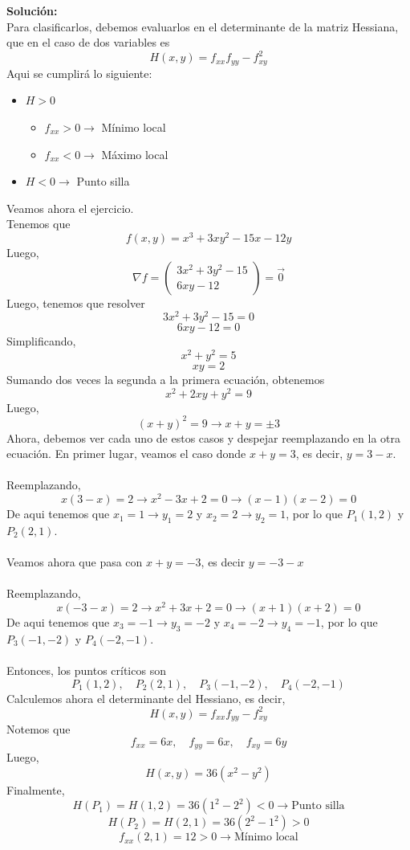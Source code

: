 \documentclass[12pt]{article}
\newenvironment{solucion}
{\begin{mdframed}[backgroundcolor=black!10]
		{\bf Solución:}\\
	}
	{
	\end{mdframed}
}
\newenvironment{preguntas}
{\begin{enumerate}\itemsep12pt
	}
	{
	\end{enumerate}
}
\newcommand{\ra}{\rightarrow}
\begin{document}
\begin{preguntas}
\begin{solucion}
Para clasificarlos, debemos evaluarlos en el determinante de la matriz Hessiana, que en el caso de dos variables es
$$H(x,y) = f_{xx}f_{yy} - f_{xy}^2$$
Aqui se cumplirá lo siguiente:
\begin{itemize}
\item $H > 0$
\begin{itemize}
    \item $f_{xx} > 0 \ra$ Mínimo local
    \item $f_{xx} < 0 \ra$ Máximo local
\end{itemize}
\item $H < 0 \ra$ Punto silla
\end{itemize}
Veamos ahora el ejercicio.\\

Tenemos que
$$f(x,y)=x^3+3xy^2-15x-12y$$
Luego,
$$\nabla f = \begin{pmatrix} 3x^2 + 3y^2 - 15 \\ 6xy - 12 \end{pmatrix} = \vec{0}$$
Luego, tenemos que resolver
$$3x^2 + 3y^2 - 15 = 0$$
$$6xy - 12 = 0$$
Simplificando,
$$x^2 + y^2 = 5$$
$$xy = 2$$
Sumando dos veces la segunda a la primera ecuación, obtenemos
$$x^2 + 2xy + y^2 = 9$$
Luego,
$$(x+y)^2 = 9 \ra x + y = \pm3$$
Ahora, debemos ver cada uno de estos casos y despejar reemplazando en la otra ecuación.
En primer lugar, veamos el caso donde $x+y = 3$, es decir, $y = 3 - x$.\\
\\
Reemplazando,
$$x(3-x) = 2 \ra x^2-3x+2=0 \ra (x-1)(x-2) = 0$$
De aqui tenemos que $x_1 = 1\ra y_1 = 2$ y $x_2 = 2 \ra y_2 = 1$, por lo que $P_1(1,2)$ y $P_2(2,1)$.\\
\\
Veamos ahora que pasa con $x+y = -3$, es decir $y = -3-x$\\
\\
Reemplazando,
$$x(-3-x) = 2 \ra x^2+3x+2=0 \ra (x+1)(x+2) = 0$$
De aqui tenemos que $x_3 = -1 \ra y_3 = -2$ y $x_4 = -2 \ra y_4 = -1$, por lo que $P_3(-1,-2)$ y $P_4(-2,-1)$.\\
\\
Entonces, los puntos críticos son
$$P_1(1,2), \quad P_2(2,1), \quad P_3(-1,-2), \quad P_4(-2,-1)$$
Calculemos ahora el determinante del Hessiano, es decir,
$$H(x,y) = f_{xx}f_{yy} - f_{xy}^2$$
Notemos que
$$f_{xx} = 6x, \quad f_{yy} = 6x,\quad f_{xy} = 6y$$
Luego,
$$H(x,y) = 36(x^2-y^2)$$
Finalmente,
$$H(P_1) = H(1,2) = 36(1^2-2^2) < 0 \ra \text{Punto silla}$$
$$H(P_2) = H(2,1) = 36(2^2-1^2) > 0$$
$$f_{xx}(2,1) = 12 > 0 \ra \text{Mínimo local}$$

\end{solucion}
\end{preguntas}
\end{document}
